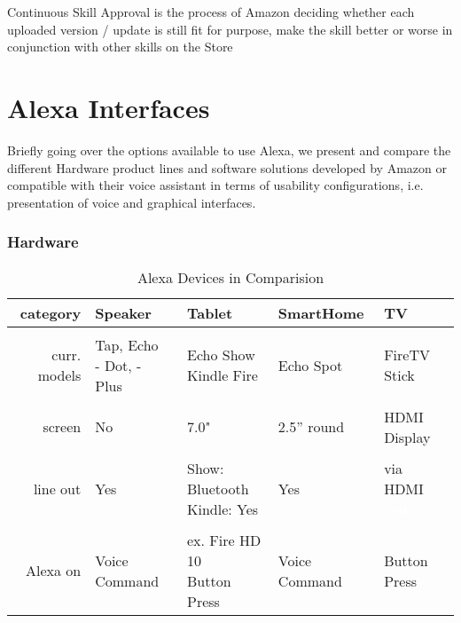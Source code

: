\begin{itemize}
	Continuous Skill Approval is the process of Amazon deciding whether each uploaded version / update is still fit for purpose, make the skill better or worse in conjunction with other skills on the Store %
\end{itemize}


\clearpage

\section{Alexa Interfaces}

Briefly going over the options available to use Alexa, we present and compare the different Hardware product lines and software solutions developed by Amazon or compatible with their voice assistant in terms of usability configurations, i.e. presentation of voice and graphical interfaces.

\subsubsection*{Hardware}
\begin{table}[htbp]
	\caption{Alexa Devices in Comparision}\label{alexaDeviceTable}
	\begin{tabularx}{\textwidth}{  r | l l l l  }
		
		category		& Speaker							& Tablet	& SmartHome	& TV	\\ \hline \hline \\
		curr. models	& \shortstack[l]{Tap, Echo \\ - Dot, - Plus}     & \shortstack[l]{Echo Show \\ Kindle Fire}    & Echo Spot & FireTV Stick \\ \hline \\
		screen  		& No      & 7.0" 		& 2.5'' round				&  HDMI Display      \\ \hline \\
		line out		& Yes      					        & \shortstack[l]{Show: Bluetooth \\ Kindle: Yes} & 	Yes & \shortstack{via HDMI \\ \textcolor{white}{text} }      \\ \hline \\
		Alexa on 	& Voice	Command					&
		\shortstack{ex. Fire HD 10\\Button Press}
		& Voice Command & %
		Button Press
	\end{tabularx}
\end{table}

